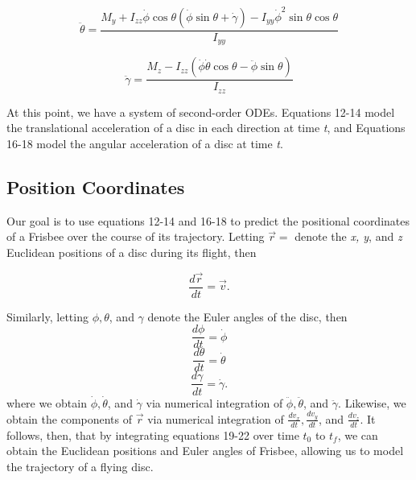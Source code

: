 \documentclass[a4paper,12pt, oneside]{article}
\newcommand{\blue}[1]{\textcolor{blue}{#1}}
\begin{document}
\begin{equation}
\ddot\theta=\frac{M_y+I_{zz}\dot\phi\cos\theta(\dot\phi\sin\theta+\dot\gamma)-I_{yy}\dot\phi^2\sin\theta\cos\theta} {I_{yy}}
\end{equation}

\begin{equation}
\ddot\gamma=\frac{M_z-I_{zz}(\dot\phi\dot\theta\cos\theta-\ddot\phi\sin\theta)}{I_{zz}}
\end{equation}

At this point, we have a system of second-order ODEs. Equations 12-14 model the translational acceleration of a disc in each direction at time \textit{t}, and Equations 16-18 model the angular acceleration of a disc at time \textit{t}.

\subsection{Position Coordinates}
Our goal is to use equations 12-14 and 16-18 to predict the positional coordinates of a Frisbee over the course of its trajectory. Letting $\vec{r}=$ denote the \textit{x, y}, and \textit{z} Euclidean positions of a disc during its flight, then 

\begin{equation}
  \label{eq:position_deriv}
  \frac{d\vec{r}}{dt} = \vec{v}.
\end{equation}

Similarly, letting $\phi, \theta$, and $\gamma$ denote the Euler angles of the disc, then
\begin{equation}
\frac{d\phi}{dt}=\dot\phi
\end{equation}
\begin{equation}
\frac{d\theta}{dt}=\dot\theta
\end{equation}
\begin{equation}
\frac{d\gamma}{dt}=\dot\gamma.
\end{equation}
where we obtain $\dot\phi, \dot\theta$, and $\dot\gamma$ via numerical integration of $\ddot\phi, \ddot\theta$, and $\ddot\gamma$. Likewise, we obtain the components of $\vec{r}$ via numerical integration of $\frac{{dv}_x}{dt}, \frac{{dv}_y}{dt}$, and $\frac{{dv}_z}{dt}$. It follows, then, that by integrating equations 19-22 over time $t_0$ to $t_f$, we can obtain the Euclidean positions and Euler angles of Frisbee, allowing us to model the trajectory of a flying disc. 
\end{document}
